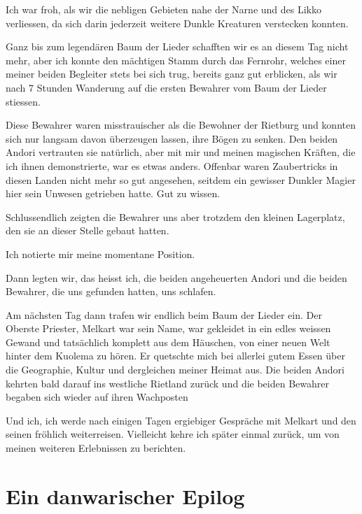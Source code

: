 Ich war froh, als wir die nebligen Gebieten nahe der Narne und des Likko verliessen, da sich darin jederzeit weitere Dunkle Kreaturen verstecken konnten.

Ganz bis zum legendären Baum der Lieder schafften wir es an diesem Tag nicht mehr, aber ich konnte den mächtigen Stamm durch das Fernrohr, welches einer meiner beiden Begleiter stets bei sich trug, bereits ganz gut erblicken, als wir nach 7 Stunden Wanderung auf die ersten Bewahrer vom Baum der Lieder stiessen.

Diese Bewahrer waren misstrauischer als die Bewohner der Rietburg und konnten sich nur langsam davon überzeugen lassen, ihre Bögen zu senken. Den beiden Andori vertrauten sie natürlich, aber mit mir und meinen magischen Kräften, die ich ihnen demonstrierte, war es etwas anders. Offenbar waren Zaubertricks in diesen Landen nicht mehr so gut angesehen, seitdem ein gewisser Dunkler Magier hier sein Unwesen getrieben hatte. Gut zu wissen.

Schlussendlich zeigten die Bewahrer uns aber trotzdem den kleinen Lagerplatz, den sie an dieser Stelle gebaut hatten.

Ich notierte mir meine momentane Position.



\trennzeichen



Dann legten wir, das heisst ich, die beiden angeheuerten Andori und die beiden Bewahrer, die uns gefunden hatten, uns schlafen.

Am nächsten Tag dann trafen wir endlich beim Baum der Lieder ein. Der Oberste Priester, Melkart war sein Name, war gekleidet in ein edles weissen Gewand und tatsächlich komplett aus dem Häuschen, von einer neuen Welt hinter dem Kuolema zu hören. Er quetschte mich bei allerlei gutem Essen über die Geographie, Kultur und dergleichen meiner Heimat aus. Die beiden Andori kehrten bald darauf ins westliche Rietland zurück und die beiden Bewahrer begaben sich wieder auf ihren Wachposten

Und ich, ich werde nach einigen Tagen ergiebiger Gespräche mit Melkart und den seinen fröhlich weiterreisen. Vielleicht kehre ich später einmal zurück, um von meinen weiteren Erlebnissen zu berichten.




\newpage
\section{Ein danwarischer Epilog}

